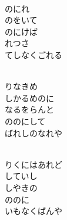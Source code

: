 \documentclass[10pt,b5j]{tarticle} %
\begin{document}
\vspace{1.5em} %
\newcommand{\linespace}{0.5em} %
\newcommand{\blocksize}{0.5\hsize} %
\newcommand{\itemmargin}{6em} %
\begin{enumerate} %
    \setlength{\itemindent}{\itemmargin} %
    \begin{minipage}[c]{\blocksize}
    
        \vspace{\linespace}
        \item~\\
        のにれ\\
        のをいて\\
        のにけば\\
        れつさ\\
        てしなくごれる
        
        \vspace{\linespace}
        \item~\\
        りなきめ\\
        しかるめのに\\
        なるをらんと\\
        ののにして\\
        ばれしのなれや
        
        \vspace{\linespace}
        \item~\\
        りくにはあれど\\
        していし\\
        しやきの\\
        ののに\\
        いもなくばんや
    
    \end{minipage}
\end{enumerate} %
\end{document}
